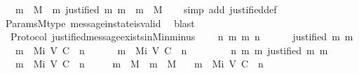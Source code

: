 \begin{isabellebody}
\ \ {\isachardoublequoteopen}{\isasymforall}\ m\ {\isasymin}\ M{\isachardot}\ {\isasymforall}\ m{\isacharprime}{\isachardot}\ justified\ m{\isacharprime}\ m\ {\isasymlongrightarrow}\ m{\isacharprime}\ {\isasymin}\ M{\isachardoublequoteclose}\isanewline
%
\isadelimproof
\ \ %
\endisadelimproof
%
\isatagproof
{}\isamarkupfalse%
\ {\isacharparenleft}simp\ add{\isacharcolon}\ justified{\isacharunderscore}def{\isacharparenright}\isanewline
\ \ \isamarkupfalse%
\ Params{\isachardot}M{\isacharunderscore}type\ message{\isacharunderscore}in{\isacharunderscore}state{\isacharunderscore}is{\isacharunderscore}valid\ \isamarkupfalse%
\ blast%
\endisatagproof
{\isafoldproof}%
%
\isadelimproof
\isanewline
%
\endisadelimproof
\isanewline
{}\isamarkupfalse%
\ {\isacharparenleft}\ Protocol{\isacharparenright}\ justified{\isacharunderscore}message{\isacharunderscore}exists{\isacharunderscore}in{\isacharunderscore}M{\isacharunderscore}i{\isacharunderscore}n{\isacharunderscore}minus{\isacharunderscore}{}\ {\isacharcolon}\isanewline
\ \ {\isachardoublequoteopen}{\isasymforall}\ n\ m\ m{\isacharprime}{\isachardot}\ n\ {\isasymin}\ {\isasymnat}\ \isanewline
\ \ {\isasymlongrightarrow}\ justified\ m{\isacharprime}\ m\isanewline
\ \ {\isasymlongrightarrow}\ m\ {\isasymin}\ M{\isacharunderscore}i\ {\isacharparenleft}V{\isacharcomma}\ C{\isacharcomma}\ {\isasymepsilon}{\isacharparenright}\ n\ \ \isanewline
\ \ {\isasymlongrightarrow}\ \ m{\isacharprime}\ {\isasymin}\ M{\isacharunderscore}i\ {\isacharparenleft}V{\isacharcomma}\ C{\isacharcomma}\ {\isasymepsilon}{\isacharparenright}\ {\isacharparenleft}n\ {\isacharminus}\ {}{\isacharparenright}{\isachardoublequoteclose}\isanewline
%
\isadelimproof
%
\endisadelimproof
%
\isatagproof
{}\isamarkupfalse%
\ {\isacharminus}\isanewline
\ \ \isamarkupfalse%
\ {\isachardoublequoteopen}{\isasymforall}\ n\ m\ m{\isacharprime}{\isachardot}\ justified\ m{\isacharprime}\ m\isanewline
\ \ {\isasymlongrightarrow}\ m\ {\isasymin}\ M{\isacharunderscore}i\ {\isacharparenleft}V{\isacharcomma}\ C{\isacharcomma}\ {\isasymepsilon}{\isacharparenright}\ n\ \ \isanewline
\ \ {\isasymlongrightarrow}\ m\ {\isasymin}\ M\ {\isasymand}\ m{\isacharprime}\ {\isasymin}\ M\isanewline
\ \ {\isasymlongrightarrow}\ m{\isacharprime}\ {\isasymin}\ M{\isacharunderscore}i\ {\isacharparenleft}V{\isacharcomma}\ C{\isacharcomma}\ {\isasymepsilon}{\isacharparenright}\ {\isacharparenleft}n\ {\isacharminus}\ {}{\isacharparenright}{\isachardoublequoteclose}\isanewline

\end{isabellebody}
